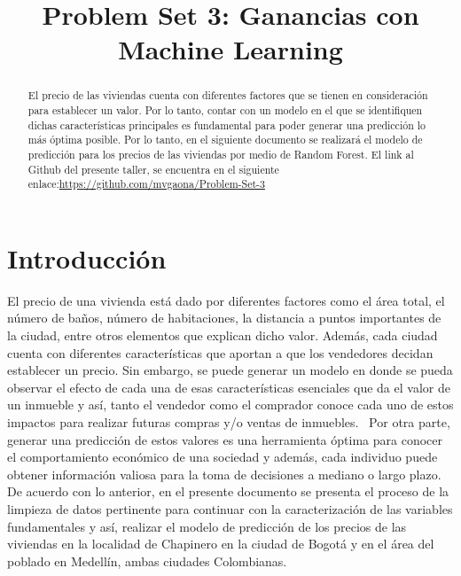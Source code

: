 \documentclass[conference, 10pt]{IEEEtran}
\begin{document}
\title{Problem Set 3: Ganancias con Machine Learning\\}

\author{
\and
{}
}

\maketitle

\begin{abstract}
El precio de las viviendas cuenta con diferentes factores que se tienen en consideración para establecer un valor. Por lo tanto, contar con un modelo en el que se identifiquen dichas características principales es fundamental para poder generar una predicción lo más óptima posible. Por lo tanto, en el siguiente documento se realizará el modelo de predicción para los precios de las viviendas por medio de Random Forest. El link al Github del presente taller, se encuentra en el siguiente enlace:\url{https://github.com/mvgaona/Problem-Set-3}\\

\end{abstract}


\section{Introducción}
El precio de una vivienda está dado por diferentes factores como el área total, el número de baños, número de habitaciones, la distancia a puntos importantes de la ciudad, entre otros elementos que explican dicho valor. Además, cada ciudad cuenta con diferentes características que aportan a que los vendedores decidan establecer un precio. Sin embargo, se puede generar un modelo en donde se pueda observar el efecto de cada una de esas características esenciales que da el valor de un inmueble y así, tanto el vendedor como el comprador conoce cada uno de estos impactos para realizar futuras compras y/o ventas de inmuebles. \
Por otra parte, generar una predicción de estos valores es una herramienta óptima para conocer el comportamiento económico de una sociedad y además, cada individuo puede obtener información valiosa para la toma de decisiones a mediano o largo plazo. De acuerdo con lo anterior, en el presente documento se presenta el proceso de la limpieza de datos pertinente para continuar con la caracterización de las variables fundamentales y así, realizar el modelo de predicción de los precios de las viviendas en la localidad de Chapinero en la ciudad de Bogotá y en el área del poblado en Medellín, ambas ciudades Colombianas.
\end{document}
